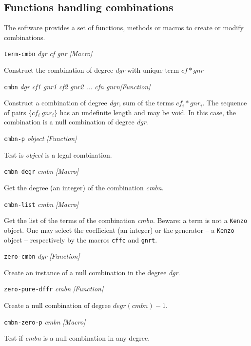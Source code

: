 \subsection {Functions handling  combinations}

The software provides a set of functions, methods or macros to create or modify
combinations.
\vskip 0.45cm
{\parindent=0mm
{\leftskip=5mm
{\tt term-cmbn} {\em dgr cf gnr} \hfill {\em [Macro]}\par}
{\leftskip=15mm
Construct the combination of degree {\em dgr} with unique term $cf * gnr$ \par}
{\leftskip=5mm
{\tt cmbn} {\em dgr cf1 gnr1 cf2 gnr2 ... cfn gnrn}\hfill {\em [Function]} \par}
{\leftskip=15mm
Construct a combination of degree {\em dgr}, sum of the terms $cf_i *  gnr_i$. The sequence of pairs
$\lbrace cf_i\  gnr_i \rbrace$ has an undefinite length and  may be void. In this case,  the combination
is a null combination of degree {\em dgr}.  \par}
{\leftskip=5mm
{\tt cmbn-p} {\em object} \hfill {\em [Function]}\par}
{\leftskip=15mm
Test is {\em object} is a legal combination. \par}
{\leftskip=5mm
{\tt cmbn-degr} {\em cmbn}   \hfill {\em [Macro]} \par}
{\leftskip=15mm
Get the degree (an integer) of the combination {\em cmbn}. \par}
{\leftskip=5mm
{\tt cmbn-list} {\em cmbn}   \hfill {\em [Macro]} \par}
{\leftskip=15mm
Get the list of the terms  of the combination {\em cmbn}. Beware: a term is not a {\tt Kenzo} object.
One may select the coefficient (an integer) or the generator -- a {\tt Kenzo} object --
respectively by the macros {\tt cffc} and {\tt gnrt}. \par}
{\leftskip=5mm
{\tt zero-cmbn} {\em dgr}   \hfill {\em [Function]} \par}
{\leftskip=15mm
Create an instance of a null combination in the degree {\em dgr}. \par}
{\leftskip=5mm
{\tt zero-pure-dffr} {\em cmbn} \hfill {\em [Function]} \par}
{\leftskip=15mm
Create  a null combination of degree $degr(cmbn) - 1$. \par}
{\leftskip=5mm
{\tt cmbn-zero-p} {\em cmbn} \hfill {\em [Macro]}\par}
{\leftskip=15mm
Test if {\em cmbn} is a null combination in any degree. \par}
}
